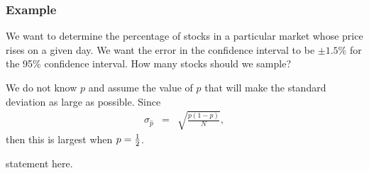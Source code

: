 \begin{frame}
  \frametitle{Example}

    We want to determine the percentage of stocks in a particular
    market whose price rises on a given day. We want the error in the
    confidence interval to be $\pm 1.5\%$ for the 95\% confidence
    interval. How many stocks should we sample?

    {

      We do not know $p$ and assume the value of $p$ that will make
      the standard deviation as large as possible. Since
      \begin{eqnarray*}
        \sigma_{\hat{p}} & = & \sqrt{\frac{p(1-p)}{N}},
      \end{eqnarray*}
      then this is largest when $p=\mbox{$\frac{1}{2}$}$.

    }

  {

    statement here.

  }

  
\end{frame}





